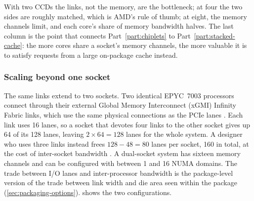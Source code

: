 


With two CCDs the links, not the memory, are the bottleneck; at four the two sides are roughly matched, which is AMD's rule of thumb; at eight, the memory channels limit, and each core's share of memory bandwidth halves. The last column is the point that connects Part~\ref{part:chiplets} to Part~\ref{part:stacked-cache}: the more cores share a socket's memory channels, the more valuable it is to satisfy requests from a large on-package cache instead.

\subsubsection*{Scaling beyond one socket}
The same links extend to two sockets. Two identical EPYC~7003 processors connect through their external Global Memory Interconnect (xGMI) Infinity Fabric links, which use the same physical connections as the PCIe lanes \cite{amd2022epyc7003}. Each link uses 16 lanes, so a socket that devotes four links to the other socket gives up 64 of its 128 lanes, leaving $2 \times 64 = 128$ lanes for the whole system. A designer who uses three links instead frees $128 - 48 = 80$ lanes per socket, 160 in total, at the cost of inter-socket bandwidth \cite{amd2022epyc7003}. A dual-socket system has sixteen memory channels and can be configured with between 1 and 16 NUMA domains. The trade between I/O lanes and inter-processor bandwidth is the package-level version of the trade between link width and die area seen within the package (\cref{sec:packaging-options}).  shows the two configurations.




